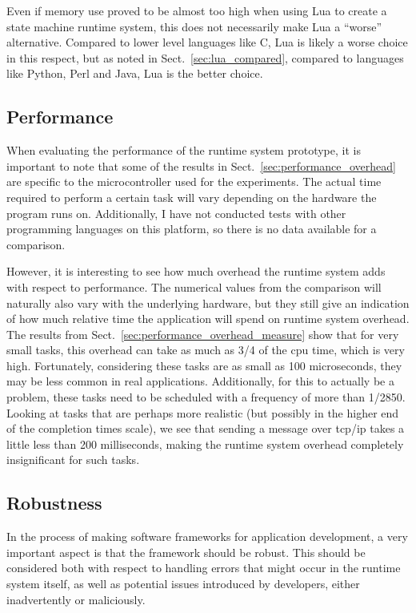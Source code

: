 \noindent
Even if memory use proved to be almost too high when using Lua to create a state machine runtime system, this does not necessarily make Lua a ``worse'' alternative. Compared to lower level languages like C, Lua is likely a worse choice in this respect, but as noted in Sect.~\ref{sec:lua_compared}, compared to languages like Python, Perl and Java, Lua is the better choice. 

\subsection{Performance}
\label{sec:disq_performance}
When evaluating the performance of the runtime system prototype, it is important to note that some of the results in Sect.~\ref{sec:performance_overhead} are specific to the microcontroller used for the experiments. The actual time required to perform a certain task will vary depending on the hardware the program runs on. Additionally, I have not conducted tests with other programming languages on this platform, so there is no data available for a comparison.

\noindent
However, it is interesting to see how much overhead the runtime system adds with respect to performance. The numerical values from the comparison will naturally also vary with the underlying hardware, but they still give an indication of how much relative time the application will spend on runtime system overhead. The results from Sect.~\ref{sec:performance_overhead_measure} show that for very small tasks, this overhead can take as much as 3/4 of the \gls{cpu} time, which is very high. Fortunately, considering these tasks are as small as 100 microseconds, they may be less common in real applications. Additionally, for this to actually be a problem, these tasks need to be scheduled with a frequency of more than 1/2850. Looking at tasks that are perhaps more realistic (but possibly in the higher end of the completion times scale), we see that sending a message over \gls{tcp}/\gls{ip} takes a little less than 200 milliseconds, making the runtime system overhead completely insignificant for such tasks.

\subsection{Robustness}
\label{sec:disq_robustness}
In the process of making software frameworks for application development, a very important aspect is that the framework should be robust. This should be considered both with respect to handling errors that might occur in the runtime system itself, as well as potential issues introduced by developers, either inadvertently or maliciously.

